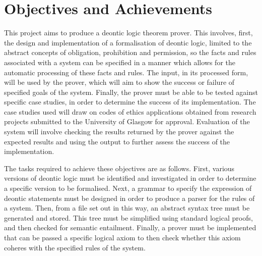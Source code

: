 \documentclass{l4proj}
\begin{document}


\section{Objectives and Achievements} %
This project aims to produce a deontic logic theorem prover. This involves, first, the design and implementation of a formalisation of deontic logic, limited to the abstract concepts of obligation, prohibition and permission, so the facts and rules associated with a system can be specified in a manner which allows for the automatic processing of these facts and rules. The input, in its processed form, will be used by the prover, which will aim to show the success or failure of specified goals of the system. Finally, the prover must be able to be tested against specific case studies, in order to determine the success of its implementation. The case studies used will draw on codes of ethics applications obtained from research projects submitted to the University of Glasgow for approval. Evaluation of the system will involve checking the results returned by the prover against the expected results and using the output to further assess the success of the implementation. 

The tasks required to achieve these objectives are as follows. First, various versions of deontic logic must be identified and investigated in order to determine a specific version to be formalised. Next, a grammar to specify the expression of deontic statements must be designed in order to produce a parser for the rules of a system. Then, from a file set out in this way, an abstract syntax tree must be generated and stored. This tree must be simplified using standard logical proofs, and then checked for semantic entailment. Finally, a prover must be implemented that can be passed a specific logical axiom to then check whether this axiom coheres with the specified rules of the system.
\end{document}
